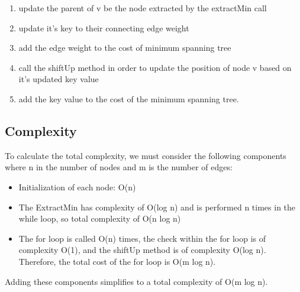 \begin{enumerate}
\begin{itemize}
\begin{itemize}
\begin{enumerate}
    	    \item update the parent of v be the node extracted by the extractMin call
    	    \item update it's key to their connecting edge weight
    	    \item add the edge weight to the cost of minimum spanning tree
    	    \item call the shiftUp method in order to update the position of node v based on it's updated key value
    	    \item add the key value to the cost of the minimum spanning tree. 
    	    \end{enumerate}
    	\end{itemize}
    \end{itemize}
\end{enumerate}
\subsection{Complexity}
To calculate the total complexity, we must consider the following components where n in the number of nodes and m is the number of edges:
\begin{itemize}
    \item Initialization of each node: O(n)
    \item The ExtractMin has complexity of O(log n) and is performed n times in the while loop, so total complexity of O(n log n)
    \item The for loop is called O(n) times, the check within the for loop is of complexity O(1), and the shiftUp method is of complexity O(log n). Therefore, the total cost of the for loop is O(m log n). 
\end{itemize}
    Adding these components simplifies to a total complexity of O(m log n).
    
 
	
\pagebreak
